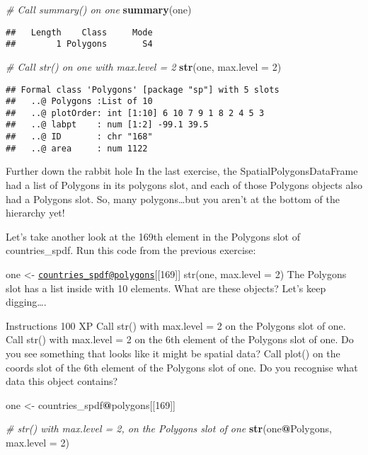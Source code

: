 \documentclass[]{article}
\newenvironment{Shaded}{\begin{snugshade}}{\end{snugshade}}
\newcommand{\CommentTok}[1]{\textcolor[rgb]{0.56,0.35,0.01}{\textit{#1}}}
\newcommand{\DataTypeTok}[1]{\textcolor[rgb]{0.13,0.29,0.53}{#1}}
\newcommand{\DecValTok}[1]{\textcolor[rgb]{0.00,0.00,0.81}{#1}}
\newcommand{\KeywordTok}[1]{\textcolor[rgb]{0.13,0.29,0.53}{\textbf{#1}}}
\newcommand{\NormalTok}[1]{#1}
\newcommand{\OperatorTok}[1]{\textcolor[rgb]{0.81,0.36,0.00}{\textbf{#1}}}
\newcommand{\StringTok}[1]{\textcolor[rgb]{0.31,0.60,0.02}{#1}}
\begin{document}
\begin{Shaded}
\begin{Highlighting}[]
\CommentTok{# Call summary() on one}
\KeywordTok{summary}\NormalTok{(one)}
\end{Highlighting}
\end{Shaded}

\begin{verbatim}
##   Length    Class     Mode 
##        1 Polygons       S4
\end{verbatim}

\begin{Shaded}
\begin{Highlighting}[]
\CommentTok{# Call str() on one with max.level = 2}
\KeywordTok{str}\NormalTok{(one, }\DataTypeTok{max.level =} \DecValTok{2}\NormalTok{)}
\end{Highlighting}
\end{Shaded}

\begin{verbatim}
## Formal class 'Polygons' [package "sp"] with 5 slots
##   ..@ Polygons :List of 10
##   ..@ plotOrder: int [1:10] 6 10 7 9 1 8 2 4 5 3
##   ..@ labpt    : num [1:2] -99.1 39.5
##   ..@ ID       : chr "168"
##   ..@ area     : num 1122
\end{verbatim}

Further down the rabbit hole In the last exercise, the
SpatialPolygonsDataFrame had a list of Polygons in its polygons slot,
and each of those Polygons objects also had a Polygons slot. So, many
polygons\ldots but you aren't at the bottom of the hierarchy yet!

Let's take another look at the 169th element in the Polygons slot of
countries\_spdf. Run this code from the previous exercise:

one \textless-
\href{mailto:countries_spdf@polygons}{\nolinkurl{countries\_spdf@polygons}}{[}{[}169{]}{]}
str(one, max.level = 2) The Polygons slot has a list inside with 10
elements. What are these objects? Let's keep digging\ldots.

Instructions 100 XP Call str() with max.level = 2 on the Polygons slot
of one. Call str() with max.level = 2 on the 6th element of the Polygons
slot of one. Do you see something that looks like it might be spatial
data? Call plot() on the coords slot of the 6th element of the Polygons
slot of one. Do you recognise what data this object contains?

\begin{Shaded}
\begin{Highlighting}[]
\NormalTok{one <-}\StringTok{ }\NormalTok{countries_spdf}\OperatorTok{@}\NormalTok{polygons[[}\DecValTok{169}\NormalTok{]]}

\CommentTok{# str() with max.level = 2, on the Polygons slot of one}
\KeywordTok{str}\NormalTok{(one}\OperatorTok{@}\NormalTok{Polygons, }\DataTypeTok{max.level =} \DecValTok{2}\NormalTok{)}
\end{Highlighting}
\end{Shaded}
\end{document}
